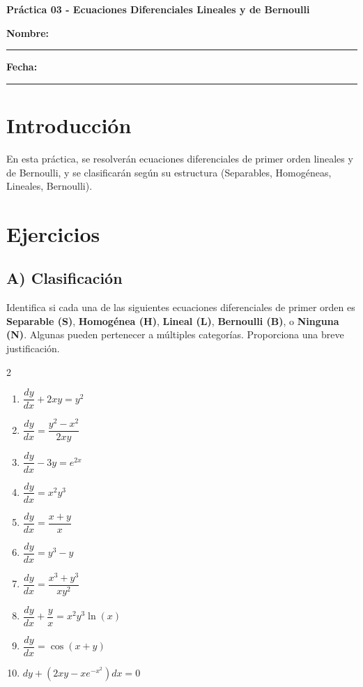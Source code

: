 \documentclass[a4paper,11pt]{article}
\begin{document}
\begin{center}
    \Large\textbf{Práctica 03 - Ecuaciones Diferenciales Lineales y de Bernoulli}\\[0.5cm]  

\end{center}
  \textbf{Nombre:} \rule{9cm}{0.4pt}  \textbf{Fecha:} \rule{4.5cm}{0.4pt}

\section*{Introducción}
En esta práctica, se resolverán ecuaciones diferenciales de primer orden lineales y de Bernoulli, y se clasificarán según su estructura (Separables, Homogéneas, Lineales, Bernoulli).

\section*{Ejercicios}

\subsection*{A) Clasificación}
Identifica si cada una de las siguientes ecuaciones diferenciales de primer orden es \textbf{Separable (S)}, \textbf{Homogénea (H)}, \textbf{Lineal (L)}, \textbf{Bernoulli (B)}, o \textbf{Ninguna (N)}. Algunas pueden pertenecer a múltiples categorías. Proporciona una breve justificación.

\begin{multicols}{2}
\begin{enumerate}[itemsep=0.1cm]
    \item $\dfrac{dy}{dx} + 2xy = y^2$
    \item $\dfrac{dy}{dx} = \dfrac{y^2-x^2}{2xy}$
    \item $\dfrac{dy}{dx} - 3y = e^{2x}$
    \item $\dfrac{dy}{dx} = x^2 y^3$
    \item $\dfrac{dy}{dx} = \dfrac{x+y}{x}$
    \item $\dfrac{dy}{dx} = y^3 - y$
    \item $\dfrac{dy}{dx} = \dfrac{x^3 + y^3}{xy^2}$
    \item $\dfrac{dy}{dx} + \dfrac{y}{x} = x^2 y^3 \ln(x)$
    \item $\dfrac{dy}{dx} = \cos(x+y)$
    \item $dy + \left(2xy - x e^{-x^2}\right)dx = 0$
\end{enumerate}
\end{multicols}
\end{document}
